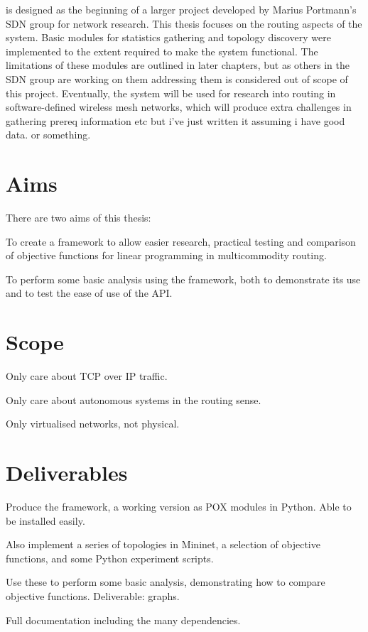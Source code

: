 \thesis{} is designed as the beginning of a larger project developed by Marius Portmann's SDN group for network research. This thesis focuses on the routing aspects of the system. Basic modules for statistics gathering and topology discovery were implemented to the extent required to make the system functional. The limitations of these modules are outlined in later chapters, but as others in the SDN group are working on them addressing them is considered out of scope of this project. Eventually, the system will be used for research into routing in software-defined wireless mesh networks, which will produce extra challenges in gathering prereq information etc but i've just written it assuming i have good data. or something.

\section{Aims}

There are two aims of this thesis:

To create a framework to allow easier research, practical testing and comparison of objective functions for linear programming in multicommodity routing.

To perform some basic analysis using the framework, both to demonstrate its use and to test the ease of use of the API.

\section{Scope}

Only care about TCP over IP traffic.

Only care about autonomous systems in the routing sense.

Only virtualised networks, not physical.

\section{Deliverables}

Produce the framework, a working version as POX modules in Python. Able to be installed easily.

Also implement a series of topologies in Mininet, a selection of objective functions, and some Python experiment scripts.

Use these to perform some basic analysis, demonstrating how to compare objective functions. Deliverable: graphs.

Full documentation including the many dependencies.
